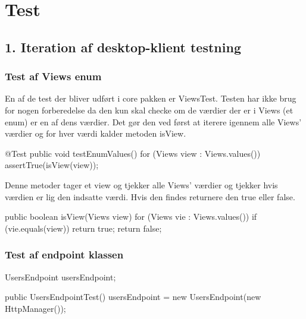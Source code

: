 \section{Test}

\subsection{1. Iteration af desktop-klient testning}
\subsubsection{Test af Views enum}
En af de test der bliver udført i core pakken er ViewsTest. Testen har ikke brug for nogen forberedelse da den kun skal checke om de værdier der er i Views (et enum) er en af dens værdier. Det gør den ved først at iterere igennem alle Views' værdier og for hver værdi kalder metoden isView.\\

\begin{code}[caption=ViewsTest.java, firstnumber=10]
@Test
public void testEnumValues() {
    for (Views view : Views.values()) {
        assertTrue(isView(view));
    }
}
\end{code}

Denne metoder tager et view og tjekker alle Views' værdier og tjekker hvis værdien er lig den indsatte værdi. Hvis den findes returnere den true eller false.

\begin{code}[caption=ViewsTest.java, firstnumber=17]
public boolean isView(Views view) {
    for (Views vie : Views.values()) {
        if (vie.equals(view)) {
            return true;
        }
    }
    return false;
}
\end{code}

\subsubsection{Test af endpoint klassen}
\begin{code}[caption=UsersEndpointTest.java, firstnumber=8]
UsersEndpoint usersEndpoint;

public UsersEndpointTest() {
    usersEndpoint = new UsersEndpoint(new HttpManager());
}
\end{code}\\

